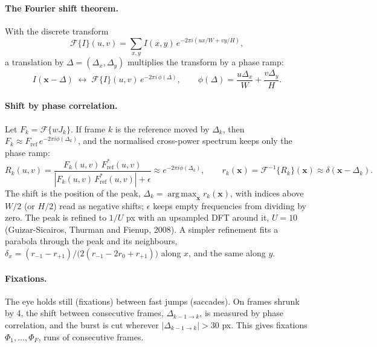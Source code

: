 \documentclass[11pt]{article}
\newcommand{\F}{\mathcal{F}}
\newcommand{\Fi}{\mathcal{F}^{-1}}
\newcommand{\x}{\mathbf{x}}
\DeclareMathOperator*{\argmax}{arg\,max}
\begin{document}
\paragraph{The Fourier shift theorem.} With the discrete transform
\begin{equation}
  \F\{I\}(u, v) = \sum_{x,y} I(x, y)\, e^{-2\pi i (ux/W + vy/H)},
\end{equation}
a translation by $\Delta = (\Delta_x, \Delta_y)$ multiplies the transform by a phase ramp:
\begin{equation}
  I(\x - \Delta) \;\longleftrightarrow\; \F\{I\}(u, v)\, e^{-2\pi i\, \phi(\Delta)},
  \qquad \phi(\Delta) = \frac{u \Delta_x}{W} + \frac{v \Delta_y}{H}.
  \label{eq:shift}
\end{equation}

\paragraph{Shift by phase correlation.} Let $F_k = \F\{w J_k\}$. If frame $k$ is the reference moved by $\Delta_k$,
then $F_k \approx F_\mathrm{ref}\, e^{-2\pi i \phi(\Delta_k)}$, and the normalised cross-power spectrum keeps only
the phase ramp:
\begin{equation}
  R_k(u, v) = \frac{F_k(u, v)\, F_\mathrm{ref}^*(u, v)}{\left| F_k(u, v)\, F_\mathrm{ref}^*(u, v) \right| + \epsilon}
  \approx e^{-2\pi i \phi(\Delta_k)},
  \qquad
  r_k(\x) = \Fi\{R_k\}(\x) \approx \delta(\x - \Delta_k).
\end{equation}
The shift is the position of the peak, $\Delta_k = \argmax_\x r_k(\x)$, with indices above $W/2$ (or $H/2$) read as
negative shifts; $\epsilon$ keeps empty frequencies from dividing by zero. The peak is refined to $1/U$ px with an
upsampled DFT around it, $U = 10$ (Guizar-Sicairos, Thurman and Fienup, 2008). A simpler refinement fits a parabola
through the peak and its neighbours, $\delta_x = (r_{-1} - r_{+1}) / \bigl(2(r_{-1} - 2r_0 + r_{+1})\bigr)$ along
$x$, and the same along $y$.

\paragraph{Fixations.} The eye holds still (fixations) between fast jumps (saccades). On frames shrunk by 4, the
shift between consecutive frames, $\Delta_{k-1 \to k}$, is measured by phase correlation, and the burst is cut
wherever $|\Delta_{k-1 \to k}| > 30$ px. This gives fixations $\Phi_1, \dots, \Phi_F$, runs of consecutive frames.
\end{document}
